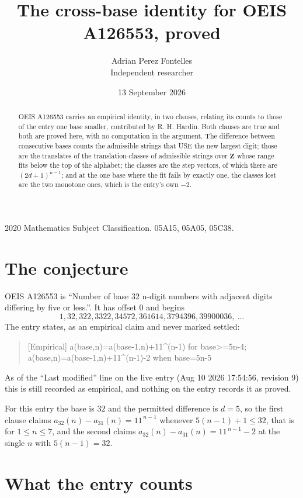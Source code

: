 \documentclass[11pt,a4paper]{article}
\title{The cross-base identity for OEIS A126553, proved}
\author{Adrian Perez Fontelles\\ \small Independent researcher}
\date{13 September 2026}
\theoremstyle{plain}
\theoremstyle{definition}
\begin{document}
\maketitle

\begin{abstract}
OEIS A126553 carries an empirical identity, in two clauses, relating its counts to those of the
entry one base smaller, contributed by R. H. Hardin. Both clauses are true and both are proved
here, with no computation in the argument. The difference between consecutive bases counts the
admissible strings that USE the new largest digit; those are the translates of the
translation-classes of admissible strings over $\mathbf{Z}$ whose range fits below the top of
the alphabet; the classes are the step vectors, of which there are $(2d+1)^{n-1}$; and at the
one base where the fit fails by exactly one, the classes lost are the two monotone ones, which
is the entry's own $-2$.
\end{abstract}

\noindent\small 2020 Mathematics Subject Classification. 05A15, 05A05, 05C38.\normalsize

\section{The conjecture}

OEIS A126553 is ``Number of base 32 n-digit numbers with adjacent digits differing by five or less.''. It has offset $0$ and begins
\[
1, 32, 322, 3322, 34572, 361614, 3794396, 39900036,\ \dots
\]
The entry states, as an empirical claim and never marked settled:
\begin{quote}
[Empirical] a(base,n)=a(base-1,n)+11\textasciicircum{}(n-1) for base>=5n-4; a(base,n)=a(base-1,n)+11\textasciicircum{}(n-1)-2 when base=5n-5
\end{quote}
As of the ``Last modified'' line on the live entry (Aug 10 2026 17:54:56, revision 9)
this is still recorded as empirical, and nothing on the entry records it as proved.

For this entry the base is $32$ and the permitted difference is $d=5$, so the first clause
claims $a_{32}(n)-a_{31}(n)=11^{\,n-1}$ whenever $5(n-1)+1\le32$, that is for
$1\le n\le7$, and the second claims $a_{32}(n)-a_{31}(n)=11^{\,n-1}-2$ at the single
$n$ with $5(n-1)=32$.

\section{What the entry counts}
\end{document}
